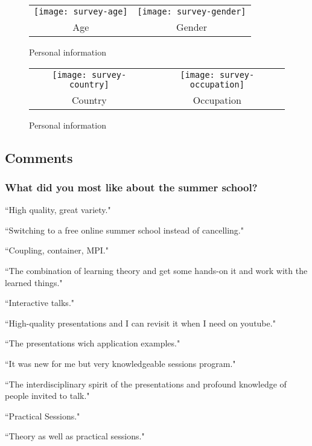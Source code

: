 \begin{figure}[H]
\centering
\begin{tabular}{cc}
\texttt{[image: survey-age]} &
\texttt{[image: survey-gender]} \\
\hspace{-3.5cm} Age & \hspace{-3cm} Gender
\end{tabular}
\caption{Personal information}
\end{figure}

\begin{figure}[H]
\centering
\begin{tabular}{cc}
\texttt{[image: survey-country]} &
\texttt{[image: survey-occupation]} \\
\hspace{-4cm} Country & \hspace{-3.5cm} Occupation
\end{tabular}
\caption{Personal information}
\end{figure}

\subsection{Comments}

\subsubsection{What did you most like about the summer school?}

``High quality, great variety."

``Switching to a free online summer school instead of cancelling."

``Coupling, container, MPI."

``The combination of learning theory and get some hands-on it and work with the learned things."

``Interactive talks."

``High-quality presentations and I can revisit it when I need on youtube."

``The presentations wich application examples."

``It was new for me but very knowledgeable sessions program."

``The interdisciplinary spirit of the presentations and profound knowledge of people invited to talk."

``Practical Sessions."

``Theory as well as practical sessions."

